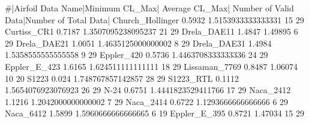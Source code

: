 #|Airfoil Data Name|Minimum CL_Max| Average CL_Max| Number of Valid Data|Number of Total Data|
Church_Hollinger    0.5932  1.5153933333333331  15  29
Curtiss_CR1         0.7187  1.3507095238095237  21  29
Drela_DAE11         1.4847  1.49895             6   29
Drela_DAE21         1.0051  1.4635125000000002  8   29
Drela_DAE31         1.4984  1.5358555555555558  9   29
Eppler_420          0.5736  1.4463708333333336  24  29
Eppler_E_423        1.6165  1.624511111111111   18  29
Lissaman_7769       0.8487  1.06074             10  20
S1223               0.024   1.748767857142857   28  29
S1223_RTL           0.1112  1.5654076923076923  26  29
N-24                0.6751  1.4441823529411766  17  29
Naca_2412           1.1216  1.2042000000000002  7   29
Naca_2414           0.6722  1.1293666666666666  6   29
Naca_6412           1.5899  1.5960666666666665  6   19
Eppler_E_395        0.8721  1.47034             15  29
